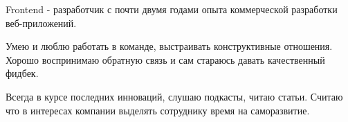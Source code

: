 

\begin{cvparagraph}

Frontend - разработчик с почти двумя годами опыта коммерческой разработки веб-приложений.

Умею и люблю работать в команде, выстраивать конструктивные отношения. Хорошо
воспринимаю обратную связь и сам стараюсь давать качественный фидбек.

Всегда в курсе последних инноваций, слушаю подкасты, читаю статьи. Считаю что в
интересах компании выделять сотруднику время на саморазвитие.
\end{cvparagraph}
